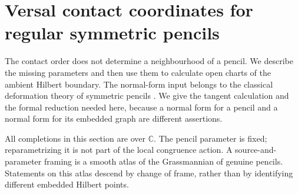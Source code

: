 \documentclass[11pt,reqno]{amsart}
\numberwithin{equation}{section}
\theoremstyle{definition}\newtheorem{definition}[theorem]{Definition}
\theoremstyle{remark}\newtheorem{remark}[theorem]{Remark}
\newcommand{\C}{\mathbb C}\newcommand{\Q}{\mathbb Q}
\begin{document}
\section{Versal contact coordinates for regular symmetric pencils}
\label{sec:versal-contacts-v162}
The contact order does not determine a neighbourhood of a pencil.
We describe the missing parameters and then use them to calculate
open charts of the ambient Hilbert boundary. The normal-form input
belongs to the classical deformation theory of symmetric pencils
\cite[Theorem~2.1, Corollary~2.1 and Lemma~3.1]{Dmytryshyn162}.
We give the tangent calculation and the formal reduction needed here,
because a normal form for a pencil and a normal form for its embedded
graph are different assertions.

All completions in this section are over $\C$. The pencil parameter
is fixed; reparametrizing it is not part of the local congruence action.
A source-and-parameter framing is a smooth atlas of the Grassmannian
of genuine pencils. Statements on this atlas descend by change of
frame, rather than by identifying different embedded Hilbert points.
\end{document}
